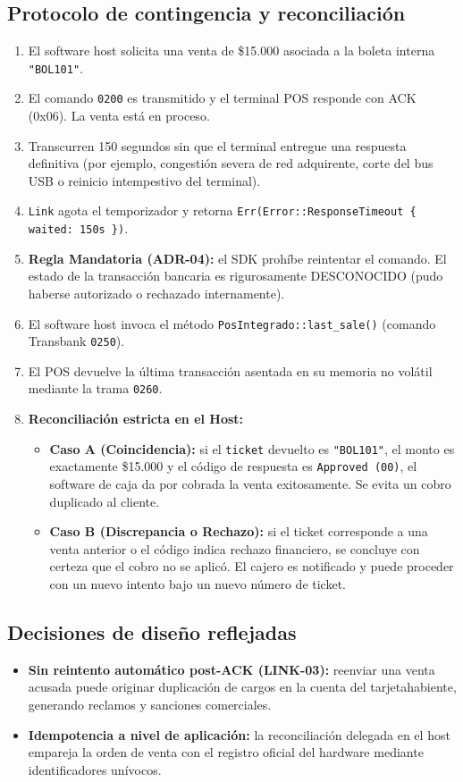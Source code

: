 \documentclass{../../plantilla/raysac-informe}
\begin{document}
\subsection{Protocolo de contingencia y reconciliación}
\begin{enumerate}
  \item El software host solicita una venta de \$15.000 asociada a la boleta interna \texttt{"BOL101"}.
  \item El comando \texttt{0200} es transmitido y el terminal POS responde con ACK (0x06). La venta está en proceso.
  \item Transcurren 150 segundos sin que el terminal entregue una respuesta definitiva (por ejemplo, congestión
    severa de red adquirente, corte del bus USB o reinicio intempestivo del terminal).
  \item \texttt{Link} agota el temporizador y retorna \texttt{Err(Error::ResponseTimeout \{ waited: 150s \})}.
  \item \textbf{Regla Mandatoria (ADR-04):} el SDK prohíbe reintentar el comando. El estado de la transacción
    bancaria es rigurosamente DESCONOCIDO (pudo haberse autorizado o rechazado internamente).
  \item El software host invoca el método \texttt{PosIntegrado::last\_sale()} (comando Transbank \texttt{0250}).
  \item El POS devuelve la última transacción asentada en su memoria no volátil mediante la trama \texttt{0260}.
  \item \textbf{Reconciliación estricta en el Host:}
    \begin{itemize}
      \item \textbf{Caso A (Coincidencia):} si el \texttt{ticket} devuelto es \texttt{"BOL101"}, el monto es
        exactamente \$15.000 y el código de respuesta es \texttt{Approved (00)}, el software de caja da por
        cobrada la venta exitosamente. Se evita un cobro duplicado al cliente.
      \item \textbf{Caso B (Discrepancia o Rechazo):} si el ticket corresponde a una venta anterior o el código
        indica rechazo financiero, se concluye con certeza que el cobro no se aplicó. El cajero es notificado
        y puede proceder con un nuevo intento bajo un nuevo número de ticket.
    \end{itemize}
\end{enumerate}

\subsection{Decisiones de diseño reflejadas}
\begin{itemize}
  \item \textbf{Sin reintento automático post-ACK (LINK-03):} reenviar una venta acusada puede originar
    duplicación de cargos en la cuenta del tarjetahabiente, generando reclamos y sanciones comerciales.
  \item \textbf{Idempotencia a nivel de aplicación:} la reconciliación delegada en el host empareja la orden
    de venta con el registro oficial del hardware mediante identificadores unívocos.
\end{itemize}
\end{document}
